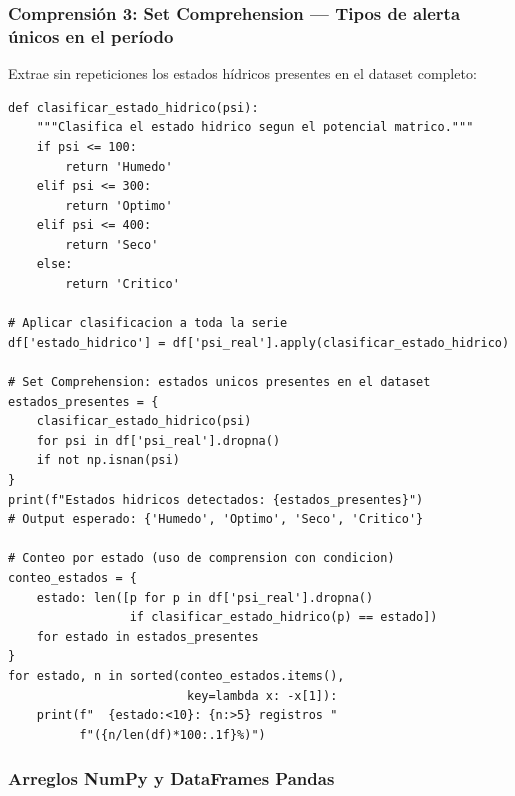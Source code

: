 \documentclass[12pt,a4paper]{article}
\begin{document}
\subsubsection{Comprensión 3: Set Comprehension --- Tipos de alerta únicos en el período}

Extrae sin repeticiones los estados hídricos presentes en el dataset completo:

\begin{lstlisting}[caption={Set Comprehension para extracción de estados únicos del sistema.}, label=lst:sc]
def clasificar_estado_hidrico(psi):
    """Clasifica el estado hidrico segun el potencial matrico."""
    if psi <= 100:
        return 'Humedo'
    elif psi <= 300:
        return 'Optimo'
    elif psi <= 400:
        return 'Seco'
    else:
        return 'Critico'

# Aplicar clasificacion a toda la serie
df['estado_hidrico'] = df['psi_real'].apply(clasificar_estado_hidrico)

# Set Comprehension: estados unicos presentes en el dataset
estados_presentes = {
    clasificar_estado_hidrico(psi) 
    for psi in df['psi_real'].dropna() 
    if not np.isnan(psi)
}
print(f"Estados hidricos detectados: {estados_presentes}")
# Output esperado: {'Humedo', 'Optimo', 'Seco', 'Critico'}

# Conteo por estado (uso de comprension con condicion)
conteo_estados = {
    estado: len([p for p in df['psi_real'].dropna() 
                 if clasificar_estado_hidrico(p) == estado])
    for estado in estados_presentes
}
for estado, n in sorted(conteo_estados.items(), 
                         key=lambda x: -x[1]):
    print(f"  {estado:<10}: {n:>5} registros "
          f"({n/len(df)*100:.1f}%)")
\end{lstlisting}

\subsubsection{Arreglos NumPy y DataFrames Pandas}
\end{document}
